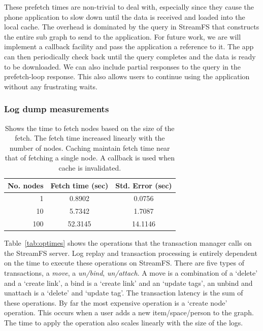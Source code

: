 These prefetch times are non-trivial to deal with, especially since they cause the phone application to slow down
until the data is received and loaded into the local cache.  The overhead is dominated by the query in StreamFS that 
constructs the entire sub graph to send to the application.  For future work,  we are will implement a
callback facility and pass the application a reference to it.  The app can then periodically check back until
the query completes and the data is ready to be downloaded.  We can also include partial responses to the query
in the prefetch-loop response.  This also allows users to continue using the application without any frustrating waits.

\subsubsection{Log dump measurements}
\begin{table}
\begin{center}
  \begin{tabular}{| r | c  c | }
    \hline
    \textbf{No. nodes} & \textbf{Fetch time (sec)} & \textbf{Std. Error (sec)} \\ \hline
    1       &   0.8902      & 0.0756 \\ \hline
    10      &   5.7342      & 1.7087 \\ \hline
    100     &   52.3145     & 14.1146 \\ 
    \hline
  \end{tabular}
\caption{Shows the time to fetch nodes based on the size of the fetch.  The fetch time
increased linearly with the number of nodes.  Caching maintain fetch time near
that of fetching a single node.  A callback is used when cache is invalidated.}
\label{tab:prefetchtimes}
\end{center}
\end{table}


Table~\ref{tab:optimes} shows the  operations that the transaction manager calls on the StreamFS server.
Log replay and transaction processing is entirely dependent on the time to execute these operations on StreamFS.
There are five types of transactions, a \emph{move}, a \emph{un/bind}, \emph{un/attach}.  A move is a combination
of a `delete' and a `create link', a bind is a `create link' and an `update tags', an unbind and unattach is a
`delete' and `update tag'.  The transaction latency is the sum of these operations.  By far the most expensive
operation is a `create node' operation.  This occurs when a user adds a new item/space/person to the graph.
The time to apply the operation also scales linearly with the size of the logs.  

